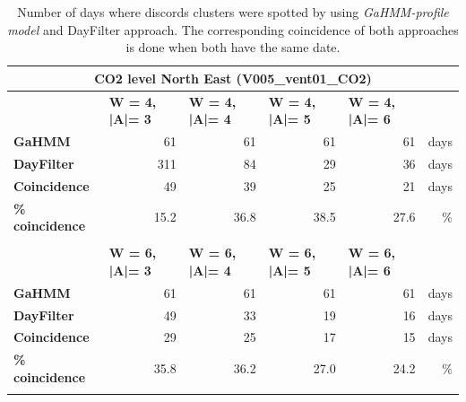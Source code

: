 \begin{table}[htbp]
  \centering
  \scriptsize
  \caption{Number of days where discords clusters were spotted by using \textit{GaHMM-profile model} and DayFilter approach. The corresponding coincidence of both approaches is done when both have the same date.}
  \begin{tabular}{|l|r|r|r|r|r|}
    \multicolumn{6}{c}{\textbf{CO2 level North East (V005\_vent01\_CO2)}} \bigstrut[b]\\
    \hline
         & \multicolumn{1}{l|}{\textbf{W = 4, |A|= 3}} & \multicolumn{1}{l|}{\textbf{W = 4, |A|= 4}} & \multicolumn{1}{l|}{\textbf{W = 4, |A|= 5}} & \multicolumn{1}{l|}{\textbf{W = 4, |A|= 6}} &  \bigstrut\\
    \hline
    \textbf{GaHMM} & 61   & 61   & 61   & 61   & days \bigstrut\\
    \hline
    \textbf{DayFilter} & 311  & 84   & 29   & 36   & days \bigstrut\\
    \hline
    \textbf{Coincidence} & 49   & 39   & 25   & 21   & days \bigstrut\\
    \hline
    \textbf{\% coincidence} & \cellcolor[rgb]{ .973,  .459,  .427} 15.2 & \cellcolor[rgb]{ .937,  .906,  .518} 36.8 & \cellcolor[rgb]{ .894,  .894,  .514} 38.5 & \cellcolor[rgb]{ .988,  .757,  .482} 27.6 & \% \bigstrut\\
    \hline
    \multicolumn{1}{r}{} & \multicolumn{1}{r}{} & \multicolumn{1}{r}{} & \multicolumn{1}{r}{} & \multicolumn{1}{r}{} & \multicolumn{1}{r}{} \bigstrut\\
    \hline
         & \multicolumn{1}{l|}{\textbf{W = 6, |A|= 3}} & \multicolumn{1}{l|}{\textbf{W = 6, |A|= 4}} & \multicolumn{1}{l|}{\textbf{W = 6, |A|= 5}} & \multicolumn{1}{l|}{\textbf{W = 6, |A|= 6}} &  \bigstrut\\
    \hline
    \textbf{GaHMM} & 61   & 61   & 61   & 61   & days \bigstrut\\
    \hline
    \textbf{DayFilter} & 49   & 33   & 19   & 16   & days \bigstrut\\
    \hline
    \textbf{Coincidence} & 29   & 25   & 17   & 15   & days \bigstrut\\
    \hline
    \textbf{\% coincidence} & \cellcolor[rgb]{ .965,  .914,  .518} 35.8 & \cellcolor[rgb]{ .953,  .91,  .518} 36.2 & \cellcolor[rgb]{ .988,  .741,  .482} 27.0 & \cellcolor[rgb]{ .984,  .675,  .467} 24.2 & \% \bigstrut\\
    \hline
    \multicolumn{1}{r}{} & \multicolumn{1}{r}{} & \multicolumn{1}{r}{} & \multicolumn{1}{r}{} & \multicolumn{1}{r}{} & \multicolumn{1}{r}{} \bigstrut[t]\\

\end{tabular}
\end{table}
